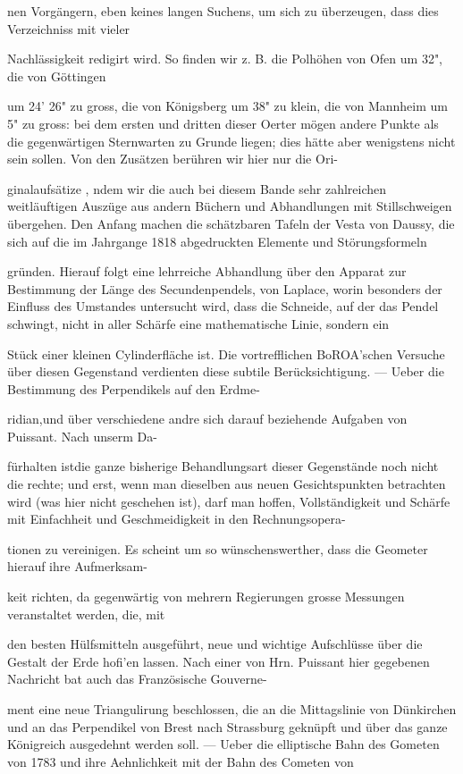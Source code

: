 \documentclass[10pt,a4paper]{article}
\begin{document}
nen Vorgängern, eben keines langen Suchens, um sich zu überzeugen, dass dies Verzeichniss mit vieler

Nachlässigkeit redigirt wird. So finden wir z. B. die Polhöhen von Ofen um 32", die von Göttingen

um 24' 26" zu gross, die von Königsberg um 38" zu klein, die von Mannheim um 5" zu gross: bei dem ersten und dritten dieser Oerter mögen andere Punkte als die gegenwärtigen Sternwarten zu Grunde liegen; dies hätte aber wenigstens nicht sein sollen. Von den Zusätzen berühren wir hier nur die Ori-

ginalaufsätize , ndem wir die auch bei diesem Bande sehr zahlreichen weitläuftigen Auszüge aus andern Büchern und Abhandlungen mit Stillschweigen übergehen. Den Anfang machen die schätzbaren Tafeln der Vesta von Daussy, die sich auf die im Jahrgange 1818 abgedruckten Elemente und Störungsformeln

gründen. Hierauf folgt eine lehrreiche Abhandlung über den Apparat zur Bestimmung der Länge des Secundenpendels, von Laplace, worin besonders der Einfluss des Umstandes untersucht wird, dass die Schneide, auf der das Pendel schwingt, nicht in aller Schärfe eine mathematische Linie, sondern ein

Stück einer kleinen Cylinderfläche ist. Die vortrefflichen BoROA'schen Versuche über diesen Gegenstand verdienten diese subtile Berücksichtigung. — Ueber die Bestimmung des Perpendikels auf den Erdme-

ridian,und über verschiedene andre sich darauf beziehende Aufgaben von Puissant. Nach unserm Da-

fürhalten istdie ganze bisherige Behandlungsart dieser Gegenstände noch nicht die rechte; und erst, wenn man dieselben aus neuen Gesichtspunkten betrachten wird (was hier nicht geschehen ist), darf man hoffen, Vollständigkeit und Schärfe mit Einfachheit und Geschmeidigkeit in den Rechnungsopera-

tionen zu vereinigen. Es scheint um so wünschenswerther, dass die Geometer hierauf ihre Aufmerksam-

keit richten, da gegenwärtig von mehrern Regierungen grosse Messungen veranstaltet werden, die, mit

den besten Hülfsmitteln ausgeführt, neue und wichtige Aufschlüsse über die Gestalt der Erde hofi'en lassen. Nach einer von Hrn. Puissant hier gegebenen Nachricht bat auch das Französische Gouverne-

ment eine neue Triangulirung beschlossen, die an die Mittagslinie von Dünkirchen und an das Perpendikel von Brest nach Strassburg geknüpft und über das ganze Königreich ausgedehnt werden soll. — Ueber die elliptische Bahn des Gometen von 1783 und ihre Aehnlichkeit mit der Bahn des Cometen von
\end{document}

